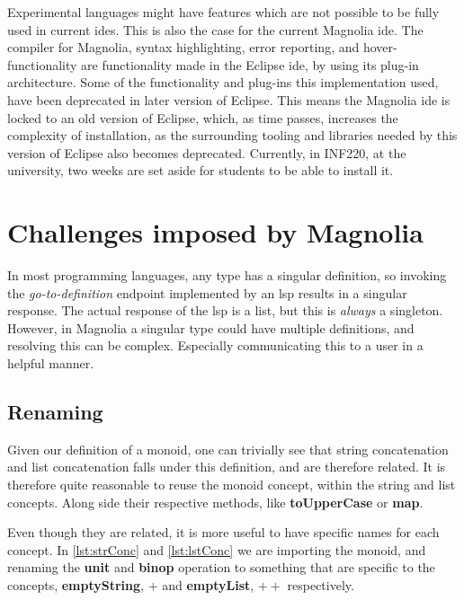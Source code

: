 Experimental languages might have features which are not possible to be fully
used in current \gls*{ide}s. This is also the case for the current Magnolia
\gls*{ide}. The compiler for Magnolia, syntax highlighting, error reporting, and
hover-functionality are functionality made in the Eclipse \gls*{ide}, by using
its plug-in architecture. Some of the functionality and plug-ins this
implementation used, have been deprecated in later version of Eclipse. This
means the Magnolia \gls*{ide} is locked to an old version of Eclipse, which, as
time passes, increases the complexity of installation, as the surrounding
tooling and libraries needed by this version of Eclipse also becomes deprecated.
Currently, in INF220, at the university, two weeks are set aside for students to
be able to install it.

\section{Challenges imposed by Magnolia}

In most programming languages, any type has a singular definition, so invoking
the \textit{go-to-definition} endpoint implemented by an \gls*{lsp} results in a
singular response. The actual response of the \gls*{lsp} is a list, but this is
\textit{always} a singleton. However, in Magnolia a singular type could have
multiple definitions, and resolving this can be complex. Especially
communicating this to a user in a helpful manner.

\subsection{Renaming}

Given our definition of a monoid\footnotemark[12]{}, one can trivially see that
string concatenation and list concatenation falls under this definition, and are
therefore related. It is therefore quite reasonable to reuse the monoid
concept, within the string and list concepts. Along side their respective
methods, like \textbf{toUpperCase} or \textbf{map}.

Even though they are related, it is more useful to have specific names for each
concept. In \ref{lst:strConc} and \ref{lst:lstConc} we are importing the
monoid\footnotemark{}, and renaming the \textbf{unit} and \textbf{binop}
operation to something that are specific to the concepts, \textbf{emptyString},
$+$ and \textbf{emptyList}, $++$ respectively.


